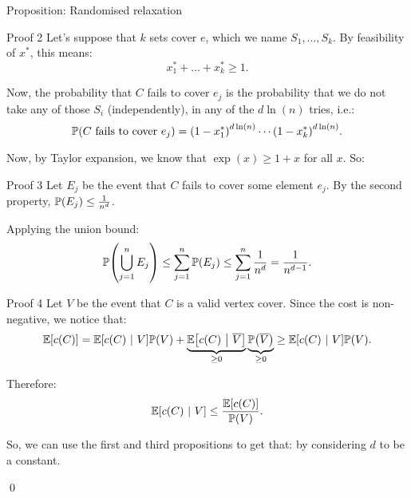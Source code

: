 \documentclass[a4paper]{article}
\begin{document}
\begin{parag}{Proposition: Randomised relaxation}
\begin{subparag}{Proof 2}
        Let's suppose that $k$ sets cover $e$, which we name $S_1, \ldots, S_k$. By feasibility of $x^*$, this means: 
        \[x_1^* + \ldots + x_k^* \geq 1.\]
        
        Now, the probability that $C$ fails to cover $e_j$ is the probability that we do not take any of those $S_i$ (independently), in any of the $d\ln\left(n\right)$ tries, i.e.: 
        \[\prob\left(\text{$C$ fails to cover $e_j$}\right) = \left(1- x_1^*\right)^{d \ln\left(n\right)} \cdots \left(1 - x_k^*\right)^{d \ln\left(n\right)}.\]

        Now, by Taylor expansion, we know that $\exp\left(x\right) \geq 1 + x$ for all $x$. So:
    \end{subparag}

    \begin{subparag}{Proof 3}
        Let $E_j$ be the event that $C$ fails to cover some element $e_j$. By the second property, $\prob\left(E_j\right) \leq \frac{1}{n^d}$.

        Applying the union bound:
        \[\prob\left(\bigcup_{j=1}^{n} E_j\right) \leq \sum_{j=1}^{n} \prob\left(E_j\right) \leq \sum_{j=1}^{n} \frac{1}{n^d} = \frac{1}{n^{d-1}}.\]
    \end{subparag}

    \begin{subparag}{Proof 4}
        Let $V$ be the event that $C$ is a valid vertex cover. Since the cost is non-negative, we notice that: 
        \[\exval\left[c\left(C\right)\right] = \exval\left[c\left(C\right) \suchthat V\right]\prob\left(V\right) + \underbrace{\exval\left[c\left(C\right) \suchthat \bar{V}\right]}_{\geq 0} \underbrace{\prob\left(\bar{V}\right)}_{\geq 0} \geq \exval\left[c\left(C\right) \suchthat V\right]\prob\left(V\right).\]

        Therefore:
        \[\exval\left[c\left(C\right) \suchthat V\right] \leq \frac{\exval\left[c\left(C\right)\right]}{\prob\left(V\right)}.\]

        So, we can use the first and third propositions to get that: 
        by considering $d$ to be a constant.

        \qed
    \end{subparag}
\end{parag}
\end{document}
